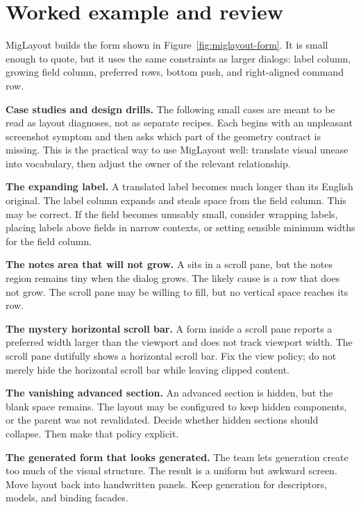 \section{Worked example and review}

\begin{examplebox}{MigLayout}
\migLayoutExample{} builds the form shown in Figure~\ref{fig:miglayout-form}. It is small enough to quote, but it uses the same constraints as larger dialogs: label column, growing field column, preferred rows, bottom push, and right-aligned command row.
\end{examplebox}

\textbf{Case studies and design drills.}
The following small cases are meant to be read as layout diagnoses, not as
separate recipes. Each begins with an unpleasant screenshot symptom and then
asks which part of the geometry contract is missing. This is the practical way
to use MigLayout well: translate visual unease into vocabulary, then adjust the
owner of the relevant relationship.

\textbf{The expanding label.}
A translated label becomes much longer than its English original. The label column expands and steals space from the field column. This may be correct. If the field becomes unusably small, consider wrapping labels, placing labels above fields in narrow contexts, or setting sensible minimum widths for the field column.

\textbf{The notes area that will not grow.}
A  sits in a scroll pane, but the notes region remains tiny when the dialog grows. The likely cause is a row that does not grow. The scroll pane may be willing to fill, but no vertical space reaches its row.

\textbf{The mystery horizontal scroll bar.}
A form inside a scroll pane reports a preferred width larger than the viewport and does not track viewport width. The scroll pane dutifully shows a horizontal scroll bar. Fix the view policy; do not merely hide the horizontal scroll bar while leaving clipped content.

\textbf{The vanishing advanced section.}
An advanced section is hidden, but the blank space remains. The layout may be configured to keep hidden components, or the parent was not revalidated. Decide whether hidden sections should collapse. Then make that policy explicit.

\textbf{The generated form that looks generated.}
The team lets generation create too much of the visual structure. The result is a uniform but awkward screen. Move layout back into handwritten panels. Keep generation for descriptors, models, and binding facades.

